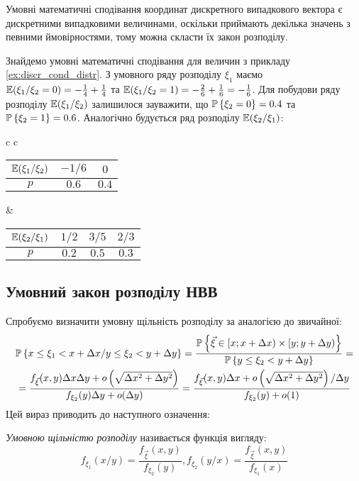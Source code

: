 Умовні математичні сподівання координат дискретного випадкового вектора є дискретними випадковими величинами, оскільки 
приймають декілька значень з певними ймовірностями, тому можна скласти 
їх закон розподілу.
\begin{example}\label{ex:discr_cond_distr_2}
    Знайдемо умовні математичні сподівання для величин з прикладу \ref{ex:discr_cond_distr}.
    З умовного ряду розподілу $\xi_1$ маємо $\E(\xi_1 / \xi_2 = 0) = -\frac{1}{4} + \frac{1}{4}$ та
    $\E(\xi_1 / \xi_2 = 1) = -\frac{2}{6} + \frac{1}{6} = -\frac{1}{6}$. Для побудови ряду розподілу $\E(\xi_1 / \xi_2)$
    залишилося зауважити, що $\P\left\{\xi_2 = 0\right\} = 0.4$ та $\P\left\{\xi_2 = 1\right\} = 0.6$.
    Аналогічно будується ряд розподілу $\E(\xi_2 / \xi_1)$:
    \begin{center}
        \begin{tabular}{c c}
            \begin{tabular}{|c|c|c|}
                \hline
                $\E(\xi_1 / \xi_2)$ & $-1/6$ & $0$ \\
                \hline
                $p$ & $0.6$ & $0.4$ \\
                \hline
            \end{tabular}
            &
            \begin{tabular}{|c|c|c|c|}
                \hline
                $\E(\xi_2 / \xi_1)$ & $1/2$ & $3/5$ & $2/3$ \\
                \hline
                $p$ & $0.2$ & $0.5$ & $0.3$ \\
                \hline
            \end{tabular}
        \end{tabular}
    \end{center}
\end{example}

\subsection{Умовний закон розподілу НВВ}
Спробуємо визначити умовну щільність розподілу за аналогією до звичайної:
\begin{gather*}
    \P\left\{x \leq \xi_1 < x + \Delta x / y \leq \xi_2 < y + \Delta y\right\} = 
    \frac{
        \P\left\{\vec{\xi} \in \left[x; x+\Delta x\right) \times \left[y; y+\Delta y\right)\right\}
    }{
        \P\left\{y \leq \xi_2 < y + \Delta y \right\}
    }
    = \\ =
    \frac{f_{\vec{\xi}}(x,y)\Delta x \Delta y + 
    o\left(\sqrt{\Delta x^2 + \Delta y^2}\right)}{f_{\xi_2}(y)\Delta y + o(\Delta y)} = 
    \frac{f_{\vec{\xi}}(x,y)\Delta x  + 
    o\left(\sqrt{\Delta x^2 + \Delta y^2}\right)/\Delta y}{f_{\xi_2}(y) + o(1)}
\end{gather*}
Цей вираз приводить до наступного означення:
\begin{definition}
    \emph{Умовною щільністю розподілу} називається функція 
    вигляду:
    \begin{equation}
        f_{\xi_1}(x/y) = \frac{f_{\vec{\xi}}(x, y)}{f_{\xi_2}(y)}, f_{\xi_2}(y/x) = \frac{f_{\vec{\xi}}(x, y)}{f_{\xi_1}(x)}
    \end{equation}
\end{definition}

